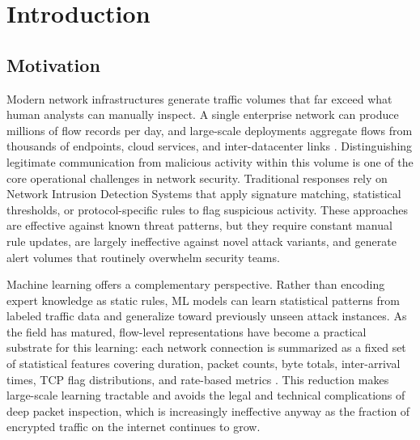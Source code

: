 \chapter{Introduction}

\section{Motivation}
Modern network infrastructures generate traffic volumes that far exceed what human analysts can manually inspect. A single enterprise network can produce millions of flow records per day, and large-scale deployments aggregate flows from thousands of endpoints, cloud services, and inter-datacenter links \parencite{ScarfoneMell2007}. Distinguishing legitimate communication from malicious activity within this volume is one of the core operational challenges in network security. Traditional responses rely on Network Intrusion Detection Systems that apply signature matching, statistical thresholds, or protocol-specific rules to flag suspicious activity. These approaches are effective against known threat patterns, but they require constant manual rule updates, are largely ineffective against novel attack variants, and generate alert volumes that routinely overwhelm security teams.

Machine learning offers a complementary perspective. Rather than encoding expert knowledge as static rules, ML models can learn statistical patterns from labeled traffic data and generalize toward previously unseen attack instances. As the field has matured, flow-level representations have become a practical substrate for this learning: each network connection is summarized as a fixed set of statistical features covering duration, packet counts, byte totals, inter-arrival times, TCP flag distributions, and rate-based metrics \parencite{Sperotto2010FlowIDS,Umer2017FlowIDS}. This reduction makes large-scale learning tractable and avoids the legal and technical complications of deep packet inspection, which is increasingly ineffective anyway as the fraction of encrypted traffic on the internet continues to grow.


